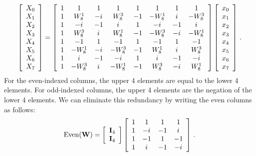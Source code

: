 \begin{displaymath}
  \left[\begin{array}{c}
      X_0 \\ X_1 \\ X_2 \\ X_3 \\ X_4 \\ X_5 \\ X_6 \\ X_7
    \end{array}\right] =
  \left[\begin{array}{cccccccc}
      1 & 1 & 1 & 1 & 1 & 1 & 1 & 1 \\
      1 & W_8^1 & -{i\mkern1mu} & W_8^3 & -1 & -W_8^1 & {i\mkern1mu} & -W_8^3 \\
      1 & -{i\mkern1mu} & -1 & {i\mkern1mu} & 1 & -{i\mkern1mu} & -1 & {i\mkern1mu} \\
      1 & W_8^3 & {i\mkern1mu} & W_8^1 & -1 & -W_8^3 & -{i\mkern1mu} & -W_8^1 \\
      1 & -1 & 1 & -1 & 1 & -1 & 1 & -1 \\
      1 & -W_8^1 & -{i\mkern1mu} & -W_8^3 & -1 & W_8^1 & {i\mkern1mu} & W_8^3 \\
      1 & {i\mkern1mu} & -1 & -{i\mkern1mu} & 1 & {i\mkern1mu} & -1 & -{i\mkern1mu} \\
      1 & -W_8^3 & {i\mkern1mu} & -W_8^1 & -1 & W_8^3 & -{i\mkern1mu} & W_8^1      
    \end{array}\right]
  \left[\begin{array}{c}
      x_0 \\ x_1 \\ x_2 \\ x_3 \\ x_4 \\ x_5 \\ x_6 \\ x_7
    \end{array}\right] \,.
\end{displaymath}
%
For the even-indexed columns, the upper 4 elements are equal to the
lower 4 elements. For odd-indexed columns, the upper 4 elements are
the negation of the lower 4 elements. We can eliminate this redundancy
by writing the even columns as follows:
%
\begin{displaymath}
  \mathrm{Even}(\mathbf{W}) =
  \left[\begin{array}{c}\mathbf{I}_4 \\ \mathbf{I}_4\end{array}\right]
  \left[\begin{array}{cccc}
      1 & 1 & 1 & 1 \\
      1 & -{i\mkern1mu} & -1 & {i\mkern1mu} \\
      1 & -1 & 1 & -1 \\
      1 & {i\mkern1mu} & -1 & -{i\mkern1mu}
    \end{array}\right] \,.
\end{displaymath}
